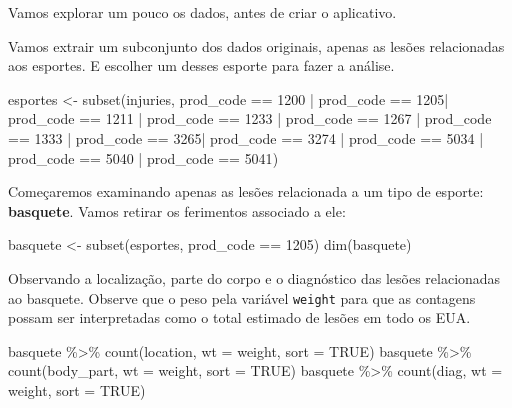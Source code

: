 \documentclass[
]{book}
\newenvironment{Shaded}{\begin{snugshade}}{\end{snugshade}}
\newcommand{\AttributeTok}[1]{\textcolor[rgb]{0.77,0.63,0.00}{#1}}
\newcommand{\ConstantTok}[1]{\textcolor[rgb]{0.00,0.00,0.00}{#1}}
\newcommand{\DecValTok}[1]{\textcolor[rgb]{0.00,0.00,0.81}{#1}}
\newcommand{\FunctionTok}[1]{\textcolor[rgb]{0.00,0.00,0.00}{#1}}
\newcommand{\NormalTok}[1]{#1}
\newcommand{\OtherTok}[1]{\textcolor[rgb]{0.56,0.35,0.01}{#1}}
\newcommand{\SpecialCharTok}[1]{\textcolor[rgb]{0.00,0.00,0.00}{#1}}
\begin{document}
Vamos explorar um pouco os dados, antes de criar o aplicativo.

Vamos extrair um subconjunto dos dados originais, apenas as lesões relacionadas aos esportes. E escolher um desses esporte para fazer a análise.

\begin{Shaded}
\begin{Highlighting}[]
\NormalTok{esportes }\OtherTok{\textless{}{-}} \FunctionTok{subset}\NormalTok{(injuries, prod\_code }\SpecialCharTok{==} \DecValTok{1200} \SpecialCharTok{|}\NormalTok{ prod\_code }\SpecialCharTok{==} \DecValTok{1205}\SpecialCharTok{|}\NormalTok{ prod\_code }\SpecialCharTok{==} \DecValTok{1211} \SpecialCharTok{|}
\NormalTok{                   prod\_code }\SpecialCharTok{==} \DecValTok{1233} \SpecialCharTok{|}\NormalTok{ prod\_code }\SpecialCharTok{==} \DecValTok{1267} \SpecialCharTok{|}\NormalTok{ prod\_code }\SpecialCharTok{==} \DecValTok{1333} \SpecialCharTok{|}\NormalTok{ prod\_code }\SpecialCharTok{==} \DecValTok{3265}\SpecialCharTok{|}
\NormalTok{                     prod\_code }\SpecialCharTok{==} \DecValTok{3274} \SpecialCharTok{|}\NormalTok{ prod\_code }\SpecialCharTok{==} \DecValTok{5034} \SpecialCharTok{|}\NormalTok{ prod\_code }\SpecialCharTok{==} \DecValTok{5040} \SpecialCharTok{|}\NormalTok{ prod\_code }\SpecialCharTok{==} \DecValTok{5041}\NormalTok{)}
\end{Highlighting}
\end{Shaded}

Começaremos examinando apenas as lesões relacionada a um tipo de esporte: \textbf{basquete}. Vamos retirar os ferimentos associado a ele:

\begin{Shaded}
\begin{Highlighting}[]
\NormalTok{basquete }\OtherTok{\textless{}{-}} \FunctionTok{subset}\NormalTok{(esportes, prod\_code }\SpecialCharTok{==} \DecValTok{1205}\NormalTok{)}
\FunctionTok{dim}\NormalTok{(basquete)}
\end{Highlighting}
\end{Shaded}

Observando a localização, parte do corpo e o diagnóstico das lesões relacionadas ao basquete. Observe que o peso pela variável \texttt{weight} para que as contagens possam ser interpretadas como o total estimado de lesões em todo os EUA.

\begin{Shaded}
\begin{Highlighting}[]
\NormalTok{basquete }\SpecialCharTok{\%\textgreater{}\%}  \FunctionTok{count}\NormalTok{(location, }\AttributeTok{wt =}\NormalTok{ weight, }\AttributeTok{sort =} \ConstantTok{TRUE}\NormalTok{) }
\NormalTok{basquete }\SpecialCharTok{\%\textgreater{}\%}  \FunctionTok{count}\NormalTok{(body\_part, }\AttributeTok{wt =}\NormalTok{ weight, }\AttributeTok{sort =} \ConstantTok{TRUE}\NormalTok{) }
\NormalTok{basquete }\SpecialCharTok{\%\textgreater{}\%}  \FunctionTok{count}\NormalTok{(diag, }\AttributeTok{wt =}\NormalTok{ weight, }\AttributeTok{sort =} \ConstantTok{TRUE}\NormalTok{) }
\end{Highlighting}
\end{Shaded}
\end{document}
